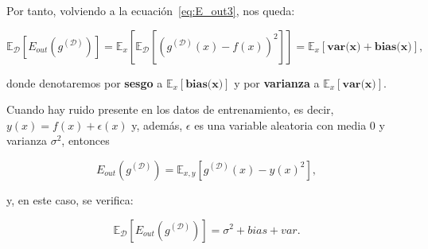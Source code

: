 Por tanto, volviendo a la ecuación~\eqref{eq:E_out3}, nos queda:

\begin{equation}\label{eq:E_out8}
    \mathbb{E}_{\mathcal{D}}[E_{out}(g^{\mathcal{(D)}})] = \mathbb{E}_{x}[\mathbb{E}_{\mathcal{D}}[{(g^{\mathcal{(D)}}(x) - f(x))}^2]] = \mathbb{E}_{x}[\textbf{var(x)} + \textbf{bias(x)}],
\end{equation}

donde denotaremos por \textbf{sesgo} a $\mathbb{E}_{x}[\textbf{bias(x)}]$ y por \textbf{varianza} a $\mathbb{E}_{x}[\textbf{var(x)}]$.\newline

\begin{observacion}
    Cuando hay ruido presente en los datos de entrenamiento, es decir, $y(x) = f(x) + \epsilon(x)$ y, además, $\epsilon$ es una variable aleatoria con media $0$ y varianza $\sigma^{2}$, entonces

    \[ E_{out}(g^{(\mathcal{D})}) = \mathbb{E}_{x, y}[g^{(\mathcal{D})}(x)-{y(x)}^{2}], \]

    y, en este caso, se verifica:

    \[ \mathbb{E}_{\mathcal{D}}[E_{out}(g^{(\mathcal{D})})] = \sigma^{2} + bias + var. \]
\end{observacion}

